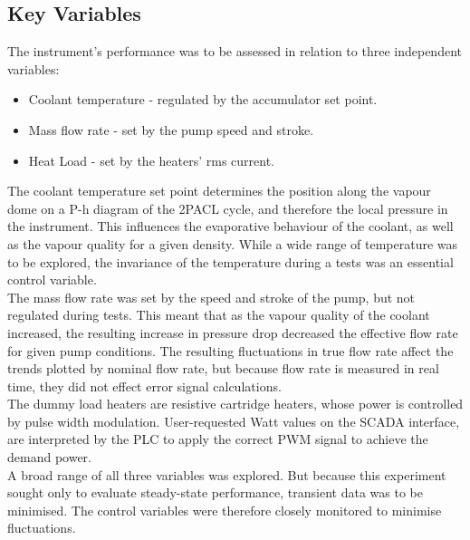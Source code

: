 \documentclass{report}
\begin{document}
\subsection{Key Variables}
The instrument's performance was to be assessed in relation to three independent variables:
\begin{itemize}
\item{Coolant temperature - regulated by the accumulator set point.}
\item{Mass flow rate - set by the pump speed and stroke.} 
\item{Heat Load - set by the heaters' rms current.}
\end{itemize}
The coolant temperature set point determines the position along the vapour dome on a P-h diagram of the 2PACL cycle, and therefore the local pressure in the instrument. This influences the evaporative behaviour of the coolant, as well as the vapour quality for a given density. While a wide range of temperature was to be explored, the invariance of the temperature during a tests was an essential control variable. \\
The mass flow rate was set by the speed and stroke of the pump, but not regulated during tests. This meant that as the vapour quality of the coolant increased, the resulting increase in pressure drop decreased the effective flow rate for given pump conditions. The resulting fluctuations in true flow rate affect the trends plotted by nominal flow rate, but because flow rate is measured in real time, they did not effect error signal calculations.\\
The dummy load heaters are resistive cartridge heaters, whose power is controlled by pulse width modulation. User-requested Watt values on the SCADA interface, are interpreted by the PLC to apply the correct PWM signal to achieve the demand power. 
\\
A broad range of all three variables was explored. But because this experiment sought only to evaluate steady-state performance, transient data was to be minimised. The control variables were therefore closely monitored to minimise fluctuations. 
\end{document}
